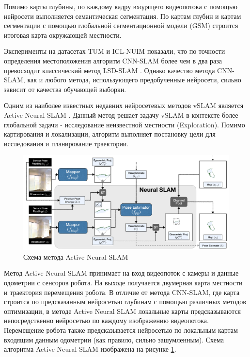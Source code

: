 \documentclass{mipt-thesis-ms}
\begin{document}
	Помимо карты глубины, по каждому кадру входящего видеопотока с помощью нейросети выполняется семантическая сегментация. По картам глубин и картам сегментации с помощью глобальной сегментационной модели (GSM) \cite{tateno2015real} строится итоговая карта окружающей местности.
	
	Эксперименты на датасетах TUM \cite{sturm2012benchmark} и ICL-NUIM \cite{handa2014benchmark} показали, что по точности определения местоположения алгоритм CNN-SLAM более чем в два раза превосходит классический метод LSD-SLAM \cite{engel2014lsd}. Однако качество метода CNN-SLAM, как и любого метода, использующего предобученные нейросети, сильно зависит от качества обучающей выборки.
	
	Одним из наиболее известных недавних нейросетевых методов vSLAM является Active Neural SLAM \cite{chaplot2020learning}. Данный метод решает задачу vSLAM в контексте более глобальной задачи - исследование неизвестной местности (Exploration). Помимо картирования и локализации, алгоритм выполняет постановку цели для исследования и планирование траектории.
	
	\begin{figure}
		\includegraphics[width=1.0\textwidth]{img/ans_scheme.png}
		\caption{Схема метода Active Neural SLAM}
		\label{figure_active_neural_slam}
	\end{figure}
		
	Метод Active Neural SLAM принимает на вход видеопоток с камеры и данные одометрии с сенсоров робота. На выходе получается двумерная карта местности и траектория перемещения робота. В отличие от метода CNN-SLAM, где карта строится по предсказанным нейросетью глубинам с помощью различных методов оптимизации, в методе Active Neural SLAM локальные карты предсказываются непосредственно нейросетью по каждому изображению видеопотока. Перемещение робота также предсказывается нейросетью по локальным картам входящим данным одометрии (как правило, сильно зашумленным). Схема алгоритма Active Neural SLAM изображена на рисунке \ref{figure_active_neural_slam}.
	
\end{document}
